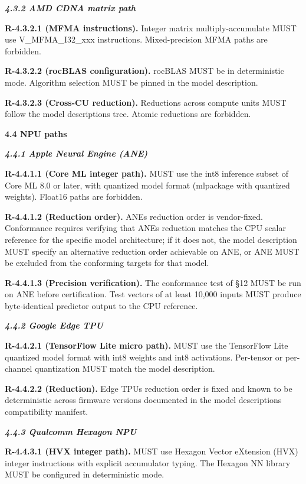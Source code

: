 \documentclass[
]{article}
\begin{document}
\emph{\textbf{4.3.2 AMD CDNA matrix path}}

\textbf{R-4.3.2.1 (MFMA instructions).} Integer matrix
multiply-accumulate MUST use V\_MFMA\_I32\_xxx instructions.
Mixed-precision MFMA paths are forbidden.

\textbf{R-4.3.2.2 (rocBLAS configuration).} rocBLAS MUST be in
deterministic mode. Algorithm selection MUST be pinned in the model
description.

\textbf{R-4.3.2.3 (Cross-CU reduction).} Reductions across compute units
MUST follow the model description\textquotesingle s tree. Atomic
reductions are forbidden.

\textbf{4.4 NPU paths}

\emph{\textbf{4.4.1 Apple Neural Engine (ANE)}}

\textbf{R-4.4.1.1 (Core ML integer path).} MUST use the int8 inference
subset of Core ML 8.0 or later, with quantized model format (mlpackage
with quantized weights). Float16 paths are forbidden.

\textbf{R-4.4.1.2 (Reduction order).} ANE\textquotesingle s reduction
order is vendor-fixed. Conformance requires verifying that
ANE\textquotesingle s reduction matches the CPU scalar reference for the
specific model architecture; if it does not, the model description MUST
specify an alternative reduction order achievable on ANE, or ANE MUST be
excluded from the conforming targets for that model.

\textbf{R-4.4.1.3 (Precision verification).} The conformance test of §12
MUST be run on ANE before certification. Test vectors of at least 10,000
inputs MUST produce byte-identical predictor output to the CPU
reference.

\emph{\textbf{4.4.2 Google Edge TPU}}

\textbf{R-4.4.2.1 (TensorFlow Lite micro path).} MUST use the TensorFlow
Lite quantized model format with int8 weights and int8 activations.
Per-tensor or per-channel quantization MUST match the model description.

\textbf{R-4.4.2.2 (Reduction).} Edge TPU\textquotesingle s reduction
order is fixed and known to be deterministic across firmware versions
documented in the model description\textquotesingle s compatibility
manifest.

\emph{\textbf{4.4.3 Qualcomm Hexagon NPU}}

\textbf{R-4.4.3.1 (HVX integer path).} MUST use Hexagon Vector eXtension
(HVX) integer instructions with explicit accumulator typing. The Hexagon
NN library MUST be configured in deterministic mode.
\end{document}
